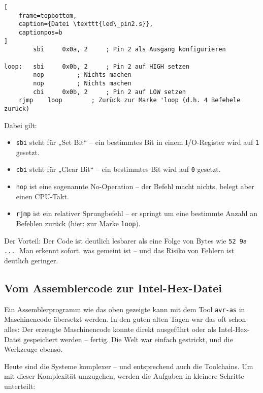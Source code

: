 \documentclass[a4paper,12pt]{article}
\begin{document}
\begin{lstlisting}[
    frame=topbottom,
    caption={Datei \texttt{led\_pin2.s}},
    captionpos=b
]
        sbi     0x0a, 2     ; Pin 2 als Ausgang konfigurieren

loop:   sbi     0x0b, 2     ; Pin 2 auf HIGH setzen
        nop		    ; Nichts machen
        nop		    ; Nichts machen
        cbi     0x0b, 2     ; Pin 2 auf LOW setzen
	rjmp    loop        ; Zurück zur Marke 'loop (d.h. 4 Befehele zurück)
\end{lstlisting}

\noindent
Dabei gilt:
\begin{itemize}
    \item
	\texttt{sbi} steht für „Set Bit“ – ein bestimmtes Bit in einem
	I/O-Register wird auf \texttt{1} gesetzt.
    \item
	\texttt{cbi} steht für „Clear Bit“ – ein bestimmtes Bit wird auf
	\texttt{0} gesetzt.
    \item
	\texttt{nop} ist eine sogenannte No-Operation – der Befehl macht
	nichts, belegt aber einen CPU-Takt.
    \item
	\texttt{rjmp} ist ein relativer Sprungbefehl – er springt um eine
	bestimmte Anzahl an Befehlen zurück (hier: zur Marke \texttt{loop}).
\end{itemize}

\noindent
Der Vorteil: Der Code ist deutlich lesbarer als eine Folge von Bytes wie
\texttt{52 9a ...}. Man erkennt sofort, was gemeint ist – und das Risiko von
Fehlern ist deutlich geringer.

\subsection{Vom Assemblercode zur Intel-Hex-Datei}

Ein Assemblerprogramm wie das oben gezeigte kann mit dem Tool \texttt{avr-as}
in Maschinencode übersetzt werden.  In den guten alten Tagen war das oft schon
alles: Der erzeugte Maschinencode konnte direkt ausgeführt oder als
Intel-Hex-Datei gespeichert werden – fertig.  Die Welt war einfach gestrickt,
und die Werkzeuge ebenso.

Heute sind die Systeme komplexer – und entsprechend auch die Toolchains. Um mit
dieser Komplexität umzugehen, werden die Aufgaben in kleinere Schritte
unterteilt:
\end{document}
